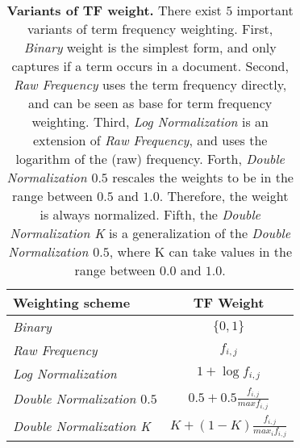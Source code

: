 \begin{table}[b!]
    \centering
    \begin{tabular}{ l c }
      \toprule
      \textbf{Weighting scheme} & \textbf{TF Weight} \\ \midrule
      \textit{Binary}  & $\{0, 1\}$  \\
      \textit{Raw Frequency} & $f_{i, j}$  \\
      \textit{Log Normalization} & $1 + \log f_{i, j}$  \\
      \textit{Double Normalization $0.5$} & $0.5 + 0.5 \frac{f_{i, j}}{max f_{i, j}}$  \\
      \textit{Double Normalization K} & $K + (1 - K)\frac{f_{i, j}}{max_i f_{i, j}}$  \\
      \bottomrule
    \end{tabular}
  \caption[Variants of TF weight]{\textbf{Variants of TF weight.} There exist $5$ important variants of term frequency weighting. First, \textit{Binary} weight is the simplest form, and only captures if a term occurs in a document. Second, \textit{Raw Frequency} uses the term frequency directly, and can be seen as base for term frequency weighting. Third, \textit{Log Normalization} is an extension of \textit{Raw Frequency}, and uses the logarithm of the (raw) frequency. Forth, \textit{Double Normalization $0.5$} rescales the weights to be in the range between $0.5$ and $1.0$. Therefore, the weight is always normalized. Fifth, the \textit{Double Normalization K} is a generalization of the \textit{Double Normalization $0.5$}, where K can take values in the range between $0.0$ and $1.0$.}
  \label{tbl:tf_variants}
\end{table}

